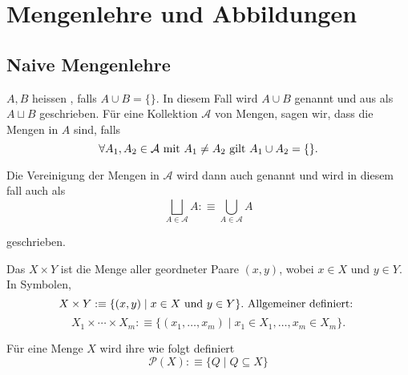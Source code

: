 \section{Mengenlehre und Abbildungen}
\subsection{Naive Mengenlehre}

\begin{mydef}[Disjunktheit]

  $A,B$ heissen , falls $A\cup B = \{ \}$.
  In diesem Fall wird $A\cup B$  genannt und aus als $A \sqcup B$ geschrieben. Für eine Kollektion $\mathcal{A}$ von Mengen, sagen wir, dass die Mengen in $A$  sind, falls
  \begin{equation}
    \forall A_1, A_2 \in \mathcal{A} $ mit $ A_1\neq A_2 $ gilt $ A_1 \cup A_2 = \{ \}.
  \end{equation}

  Die Vereinigung der Mengen in $\mathcal{A}$ wird dann auch  genannt und wird in diesem fall auch als
  \begin{equation}
    \bigsqcup_{A\in\mathcal{A}} A :\equiv \bigcup_{A\in\mathcal{A}} A
  \end{equation}

  geschrieben.
\end{mydef}

\begin{mydef}
  Das  $X\times Y$ ist die Menge aller geordneter Paare $(x,y)$, wobei $x\in X$ und $y \in Y$. In Symbolen,
  \begin{equation}
    X \times Y :\equiv \{(x,y) \mid x \in X $ und $ y \in Y \}. $ Allgemeiner definiert: $
  \end{equation}
  \begin{equation}
    X_1 \times \cdots \times X_m :\equiv \{ (x_1, \ldots, x_m) \mid x_1 \in X_1, \ldots, x_m \in X_m \}.
  \end{equation}
\end{mydef}

\begin{mydef} Für eine Menge $X$ wird ihre  wie folgt definiert
  \begin{equation}
    \mathcal{P}(X) :\equiv \{Q \mid Q \subseteq X \}
  \end{equation}
\end{mydef}

